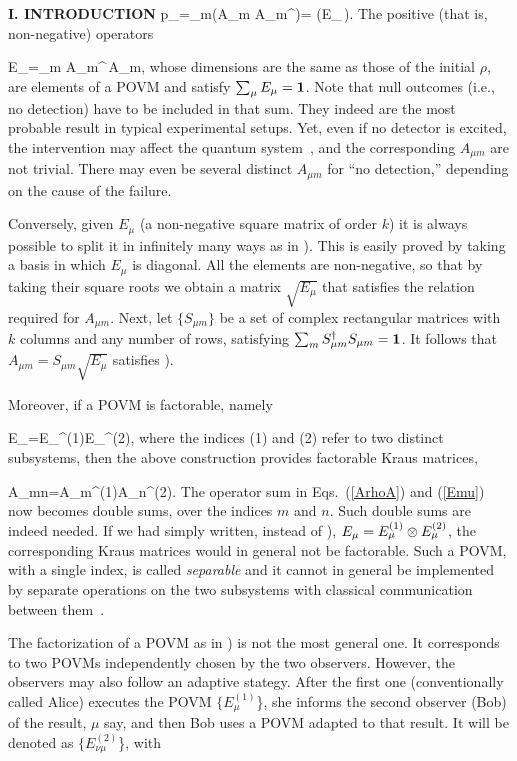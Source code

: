 \begin{center}{\bf I. INTRODUCTION}
\beq  p_\mu=\sum_m\Tr(A_{\mu m}\,\rho\,A_{\mu m}^\dagger)=
  \Tr(E_\mu\,\rho).\eeq
The positive (that is, non-negative) operators 

\beq E_\mu=\sum_m A_{\mu m}^\dagger\,A_{\mu m}, \label{Emu}\eeq
whose dimensions are the same as those of the initial $\rho$, are
elements of a POVM and satisfy $\sum_\mu E_\mu={\bf1}$. Note that null
outcomes (i.e., no detection) have to be included in that sum. They
indeed are the most probable result in typical experimental setups. Yet,
even if no detector is excited, the intervention may affect the quantum
system~\cite{Dicke}, and the corresponding $A_{\mu m}$ are not trivial.
There may even be several distinct $A_{\mu m}$ for ``no detection,''
depending on the cause of the failure.

Conversely, given $E_\mu$ (a non-negative square matrix of order $k$) it
is always possible to split it in infinitely many ways as in
). This is easily proved by taking a basis in which $E_\mu$ is
diagonal. All the elements are non-negative, so that by taking their
square roots we obtain a matrix $\sqrt{E_\mu}$ that satisfies the
relation required for $A_{\mu m}$. Next, let $\{S_{\mu m}\}$ be a set
of complex rectangular matrices with $k$ columns and any number of rows,
satisfying $\sum_m S_{\mu m}^\dagger S_{\mu m}={\bf1}$. It follows that
$A_{\mu m}=S_{\mu m}\sqrt{E_\mu}$ satisfies ).

Moreover, if a POVM is factorable, namely

\beq E_{\mu\nu}=E_\mu^{(1)}\0E_\nu^{(2)}, \label{Efact} \eeq
where the indices (1) and (2) refer to two distinct subsystems, then
the above construction provides factorable Kraus matrices, 

\beq A_{\mu\nu mn}=A_{\mu m}^{(1)}\0A_{\nu n}^{(2)}. \eeq
The operator sum in Eqs.~(\ref{ArhoA}) and (\ref{Emu}) now becomes
double sums, over the indices $m$ and $n$. Such double sums are indeed
needed. If we had simply written, instead of ),
$E_{\mu}=E_\mu^{(1)}\otimes E_\mu^{(2)}$, the corresponding Kraus matrices
would in general not be factorable. Such a POVM, with a single index, is
called {\it separable\/} and it cannot in general be implemented by
separate operations on the two subsystems with classical communication
between them~\cite{Ben}.

The factorization of a POVM as in ) is not the most general
one. It corresponds to two POVMs independently chosen by the two
observers. However, the observers may also follow an adaptive stategy.
After the first one (conventionally called Alice) executes the POVM
$\{E_\mu^{(1)}$\}, she informs the second observer (Bob) of the result,
$\mu$ say, and then Bob uses a POVM adapted to that result. It will be
denoted as $\{E_{\nu\mu}^{(2)}$\}, with


\end{center}

